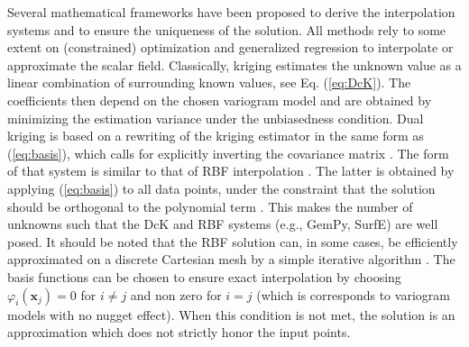 \documentclass[preprint]{ring20}
\newcommand{\bx}{\mathbf{x}}
\begin{document}
Several mathematical frameworks have been proposed to derive the interpolation systems and to ensure the uniqueness of the solution. 
All methods rely to some extent on (constrained) optimization and generalized regression to interpolate or approximate the scalar field. Classically, kriging estimates the unknown value as a linear combination of surrounding known values, see Eq. (\ref{eq:DcK}). The coefficients then depend on the chosen variogram model and are obtained by minimizing the estimation variance under the unbiasedness condition. Dual kriging is based on a rewriting of the kriging estimator in the same form as (\ref{eq:basis}), which calls for explicitly inverting the covariance matrix \citep{Lajaunie1997MG,Chiles04OMSMP}. The form of that system is similar to that of RBF interpolation \citep{Dubrule1984CG,Hillier2014MG}. The latter is obtained by applying (\ref{eq:basis}) to all data points, under the constraint that the solution should be orthogonal to the polynomial term \citep{Carr2001,Hillier2014MG}. This makes the number of unknowns such that the DcK and RBF systems (e.g., GemPy, SurfE) are well posed. It should be noted that the RBF solution can, in some cases, be efficiently approximated on a discrete Cartesian mesh by a simple iterative algorithm \citep{Park2006ITVCG}. The basis functions can be chosen to ensure exact interpolation by choosing $\varphi_i(\bx_j)=0$ for $i \neq j$ and non zero for $i = j$ (which is corresponds to variogram models with no nugget effect). When this condition is not met, the solution is an approximation which does not strictly honor the input points. 
\end{document}
